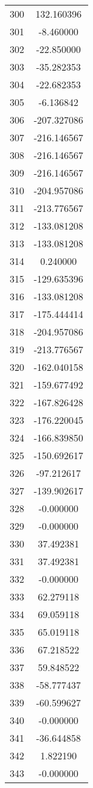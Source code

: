 \documentclass[12pt]{article}
\begin{document}
\begin{longtable}{@{}cc@{}}
300 & 132.160396 \\
301 & -8.460000 \\
302 & -22.850000 \\
303 & -35.282353 \\
304 & -22.682353 \\
305 & -6.136842 \\
306 & -207.327086 \\
307 & -216.146567 \\
308 & -216.146567 \\
309 & -216.146567 \\
310 & -204.957086 \\
311 & -213.776567 \\
312 & -133.081208 \\
313 & -133.081208 \\
314 & 0.240000 \\
315 & -129.635396 \\
316 & -133.081208 \\
317 & -175.444414 \\
318 & -204.957086 \\
319 & -213.776567 \\
320 & -162.040158 \\
321 & -159.677492 \\
322 & -167.826428 \\
323 & -176.220045 \\
324 & -166.839850 \\
325 & -150.692617 \\
326 & -97.212617 \\
327 & -139.902617 \\
328 & -0.000000 \\
329 & -0.000000 \\
330 & 37.492381 \\
331 & 37.492381 \\
332 & -0.000000 \\
333 & 62.279118 \\
334 & 69.059118 \\
335 & 65.019118 \\
336 & 67.218522 \\
337 & 59.848522 \\
338 & -58.777437 \\
339 & -60.599627 \\
340 & -0.000000 \\
341 & -36.644858 \\
342 & 1.822190 \\
343 & -0.000000 \\

\end{longtable}
\end{document}

